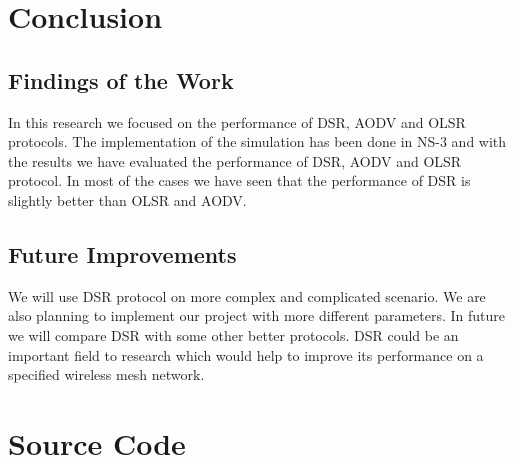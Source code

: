 \documentclass[12pt,a4paper]{report}
\begin{document}
\chapter{Conclusion}
\section{Findings of the Work}
In this research we focused on the performance of DSR, AODV and OLSR protocols. The
implementation of the simulation has been done in NS-3 and with the results we have evaluated
the performance of  DSR, AODV and OLSR protocol. In most of the cases we have seen that the
performance of DSR is slightly better than OLSR and AODV. 
\section{Future Improvements}

We will use DSR protocol on more complex and complicated scenario. We are also planning
to implement our project with more different parameters. In future we will compare DSR with
some other better protocols. DSR could be an important field to research which would help to
improve its performance on a specified wireless mesh network.


%
%


\appendices
\chapter{Source Code}

\end{document}
